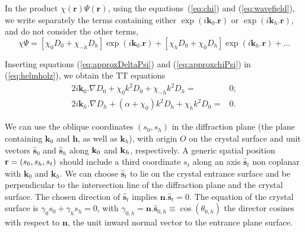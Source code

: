 \documentclass{iucr}
\begin{document}
In the product $\chi(\textbf{r}) \Psi(\textbf{r})$, using the equations~(\ref{eq:chi}) and (\ref{eq:wavefield}), we write separately the terms containing either $\exp(i \textbf{k}_0 . \textbf{r})$ or $\exp(i \textbf{k}_h . \textbf{r})$, and do not consider the other terms,
\begin{equation}
\label{eq:approxchiPsi}
\chi\Psi =
[\chi_0 D_0 + \chi_{-h} D_h ] \exp(i \textbf{k}_0 . \textbf{r}) +
[\chi_h D_0 + \chi_0 D_h] \exp(i \textbf{k}_h . \textbf{r})+... 
\end{equation}

Inserting equations (\ref{eq:approxDeltaPsi}) and (\ref{eq:approxchiPsi}) in (\ref{eq:helmholz}), we obtain the TT equations 
\begin{subequations}
\label{eq:TTvectorAlpha}
\begin{align}
2 i \textbf{k}_0 . \nabla D_0 + \chi_0 k^2 D_0 + \chi_{-h} k^2 D_h =& 0; \\
2 i \textbf{k}_h . \nabla D_h + (\alpha + \chi_0) k^2 D_h + \chi_{h} k^2 D_0 =& 0.
\end{align}
\end{subequations}

We can use the oblique coordinates $(s_0,s_h)$ in the diffraction plane (the plane containing $\textbf{k}_0$ and $\textbf{h}$, as well as $\textbf{k}_h$),
with origin $O$ on the crystal surface and unit vectors 
$\hat{ \textbf{s}}_{0}$ and $\hat{ \textbf{s}}_{h}$ along $\textbf k_0$ and $\textbf k_h$, respectively.
A generic spatial position  $\textbf r=(s_0,s_h,s_t)$ should include a third coordinate $s_t$ along an axis $\hat{\textbf{s}}_t$ non coplanar with $\textbf{k}_0$ and $\textbf{k}_h$.
We can choose $\hat{ \textbf{s}}_{t}$ to lie on the crystal entrance surface and be perpendicular to the intersection line of the diffraction plane and the crystal surface.
The chosen direction of $\hat{\textbf{s}}_{t}$ implies $
\textbf{n}.\hat{\textbf{s}}_t=0$.
The equation of the crystal surface is $\gamma_0 s_0 + \gamma_h s_h =0$, with $\gamma_{0,h}=\textbf{n}.\hat{\textbf{s}}_{0,h} \equiv \cos(\theta_{0,h})$ the director cosines with respect to $\textbf{n}$, the unit inward normal vector to the entrance plane surface.
\end{document}
